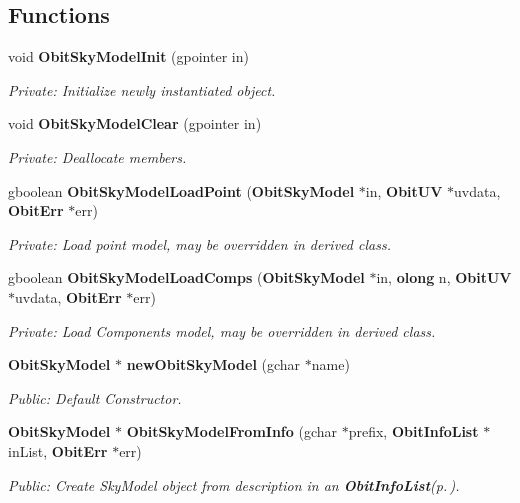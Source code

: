 \subsection*{Functions}
\begin{CompactItemize}
\item 
void {\bf Obit\-Sky\-Model\-Init} (gpointer in)
\begin{CompactList}\small\item\em Private: Initialize newly instantiated object. \item\end{CompactList}\item 
void {\bf Obit\-Sky\-Model\-Clear} (gpointer in)
\begin{CompactList}\small\item\em Private: Deallocate members. \item\end{CompactList}\item 
gboolean {\bf Obit\-Sky\-Model\-Load\-Point} ({\bf Obit\-Sky\-Model} $\ast$in, {\bf Obit\-UV} $\ast$uvdata, {\bf Obit\-Err} $\ast$err)
\begin{CompactList}\small\item\em Private: Load point model, may be overridden in derived class. \item\end{CompactList}\item 
gboolean {\bf Obit\-Sky\-Model\-Load\-Comps} ({\bf Obit\-Sky\-Model} $\ast$in, {\bf olong} n, {\bf Obit\-UV} $\ast$uvdata, {\bf Obit\-Err} $\ast$err)
\begin{CompactList}\small\item\em Private: Load Components model, may be overridden in derived class. \item\end{CompactList}\item 
{\bf Obit\-Sky\-Model} $\ast$ {\bf new\-Obit\-Sky\-Model} (gchar $\ast$name)
\begin{CompactList}\small\item\em Public: Default Constructor. \item\end{CompactList}\item 
{\bf Obit\-Sky\-Model} $\ast$ {\bf Obit\-Sky\-Model\-From\-Info} (gchar $\ast$prefix, {\bf Obit\-Info\-List} $\ast$in\-List, {\bf Obit\-Err} $\ast$err)
\begin{CompactList}\small\item\em Public: Create Sky\-Model object from description in an {\bf Obit\-Info\-List}{\rm (p.\,\pageref{structObitInfoList})}. \item\end{CompactList}\item 

\end{CompactItemize}
